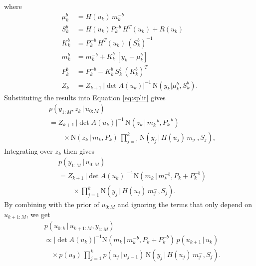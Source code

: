 \documentclass[twocolumn]{autart}    %
\begin{document}
%
where
%
\begin{equation}
\begin{split}
    \mu^b_k &= H(u_k) \, m^{-b}_k \\
      S^b_k &= H(u_k) P^{-b}_k \, H^T(u_k) + R(u_k) \\
      K^b_k &= P^{-b}_k \, H^T(u_k) \, (S^b_k)^{-1} \\
      m^b_k &= m^{-b}_k + K^b_k \, [y_k - \mu^b_k] \\
      P^b_k &= P^{-b}_k - K^b_k \, S^b_k \, (K^b_k)^T \\
        Z_k &= Z_{k+1} \, |\det A(u_k)|^{-1} \,
               \mathrm{N}(y_k | \mu^b_k,S^b_k).
\end{split}
\end{equation}
%
Substituting the results into Equation \eqref{eq:split} gives
%
\begin{equation}
\begin{split}
  &p(y_{1:M},z_k\,|\,u_{0:M}) \\
  &= Z_{k+1} \, |\det A(u_k)|^{-1} \,
  \mathrm{N}(z_{k} \,|\, m^{-b}_{k}, P^{-b}_{k}) \\
  &\qquad \times
  \mathrm{N}(z_k\,|\,m_k,P_k) \,
  \prod_{j=1}^k \mathrm{N}(y_j\,|\,H(u_j) \, m^-_j,S_j),
\end{split}
\end{equation}
%
Integrating over $z_k$ then gives
%
\begin{equation}
\begin{split}
  &p(y_{1:M}\,|\,u_{0:M}) \\
  &= Z_{k+1} \, |\det A(u_k)|^{-1} 
  \mathrm{N}(m_k\,|\,m^{-b}_{k},P_k+P^{-b}_{k}) \\
  &\qquad \times 
  \prod_{j=1}^k \mathrm{N}(y_j\,|\,H(u_j) \, m^-_j,S_j).
\end{split}
\end{equation}
%
By combining with the prior of $u_{0:M}$ and ignoring the
terms that only depend on $u_{k+1:M}$, we get
%
\begin{equation}
\begin{split}
  &p(u_{0:k}\,|\,u_{k+1:M},y_{1:M}) \\
  &\propto
  |\det A(u_k)|^{-1} 
  \mathrm{N}(m_k\,|\,m^{-b}_{k},P_k+P^{-b}_{k}) \, p(u_{k+1}\,|\,u_{k}) \\  
  &\quad \times 
  p(u_0) \,
  \prod_{j=1}^k p(u_{j}\,|\,u_{j-1}) \,
  \mathrm{N}(y_j\,|\,H(u_j) \, m^-_j,S_j).
\end{split}
\end{equation}
\end{document}
